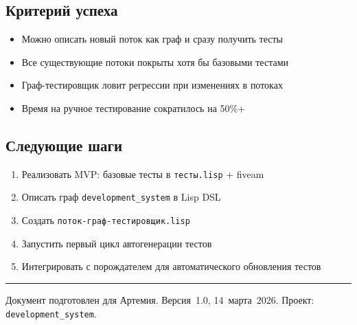 \documentclass[10pt, oneside]{article}
\begin{document}
\subsection{Критерий успеха}

\begin{successbox}[title={Через месяц система считается успешной, если:}]
\begin{itemize}[leftmargin=1em]
  \item Можно описать новый поток как граф и сразу получить тесты
  \item Все существующие потоки покрыты хотя бы базовыми тестами
  \item Граф-тестировщик ловит регрессии при изменениях в потоках
  \item Время на ручное тестирование сократилось на 50\%+
\end{itemize}
\end{successbox}

\subsection{Следующие шаги}

\begin{enumerate}[leftmargin=1.5em]
  \item Реализовать MVP: базовые тесты в \texttt{тесты.lisp} + fiveam
  \item Описать граф \texttt{development\_system} в Lisp DSL
  \item Создать \texttt{поток-граф-тестировщик.lisp}
  \item Запустить первый цикл автогенерации тестов
  \item Интегрировать с порождателем для автоматического обновления тестов
\end{enumerate}

\vspace{1cm}
\hrule
\vspace{4mm}
{\small\color{MidGray}
  Документ подготовлен для Артемия.
  Версия~1.0, 14~марта~2026.
  Проект: \texttt{development\_system}.
}
\end{document}
